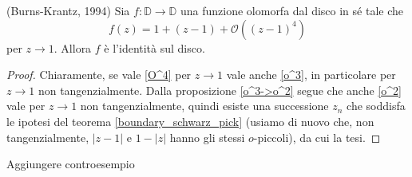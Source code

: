 \begin{thm} \label{burns_krantz}
  (Burns-Krantz, 1994) Sia $f:\mathbb{D} \longrightarrow \mathbb{D}$ una funzione olomorfa dal disco in sé tale che
  \begin{equation} \label{O^4}
    f(z)=1+(z-1)+\mathcal{O}((z-1)^4)
  \end{equation}
  per $z \longrightarrow 1$. Allora $f$ è l'identità sul disco.
\end{thm}

\begin{proof}

  Chiaramente, se vale \eqref{O^4} per $z \longrightarrow 1$ vale anche \eqref{o^3}, in particolare per $z \longrightarrow 1$ non tangenzialmente.
  Dalla proposizione \ref{o^3->o^2} segue che anche \eqref{o^2} vale per $z \longrightarrow 1$ non tangenzialmente, quindi esiste una successione $z_n$ che soddisfa le ipotesi del teorema \ref{boundary_schwarz_pick} (usiamo di nuovo che, non tangenzialmente, $|z-1|$ e $1-|z|$ hanno gli stessi $o$-piccoli), da cui la tesi.
\end{proof}

Aggiungere controesempio
